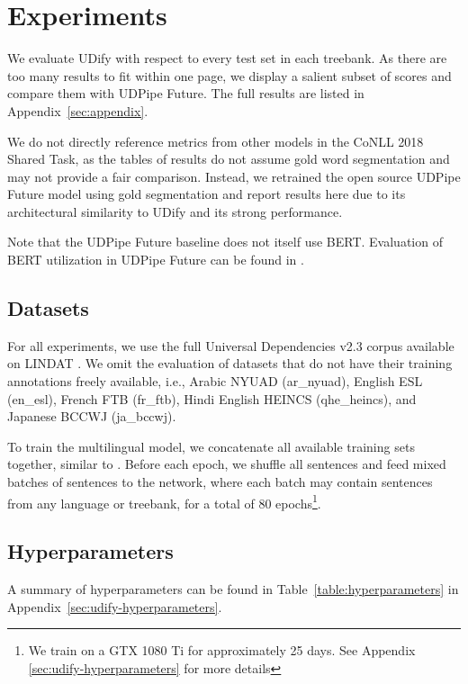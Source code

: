 \documentclass[11pt,a4paper]{article}
\begin{document}
\section{Experiments}

We evaluate UDify with respect to every test set in each treebank.
As there are too many results to fit within one page, we display a salient subset of scores and compare them with UDPipe Future.
The full results are listed in Appendix~\ref{sec:appendix}.

We do not directly reference metrics from other models in the CoNLL 2018 Shared Task, as the tables of results do not assume gold word segmentation and may not provide a fair comparison.
Instead, we retrained the open source UDPipe Future model using gold segmentation and report results here due to its architectural similarity to UDify and its strong performance.

Note that the UDPipe Future baseline does not itself use BERT. Evaluation of BERT utilization in UDPipe Future can be found in \citet{udpipe_bert}.

\subsection{Datasets}

For all experiments, we use the full Universal Dependencies v2.3 corpus available on LINDAT \cite{11234/1-2895}.
We omit the evaluation of datasets that do not have their training annotations freely available, i.e., Arabic NYUAD (ar\_nyuad), English ESL (en\_esl), French FTB (fr\_ftb), Hindi English HEINCS (qhe\_heincs), and Japanese BCCWJ (ja\_bccwj).

To train the multilingual model, we concatenate all available training sets together, similar to .
Before each epoch, we shuffle all sentences and feed mixed batches of sentences to the network, where each batch may contain sentences from any language or treebank, for a total of 80 epochs\footnote{
We train on a GTX 1080 Ti for approximately 25 days. See Appendix \ref{sec:udify-hyperparameters} for more details}.

\subsection{Hyperparameters}

A summary of hyperparameters can be found in Table~\ref{table:hyperparameters} in Appendix~\ref{sec:udify-hyperparameters}.
\end{document}
